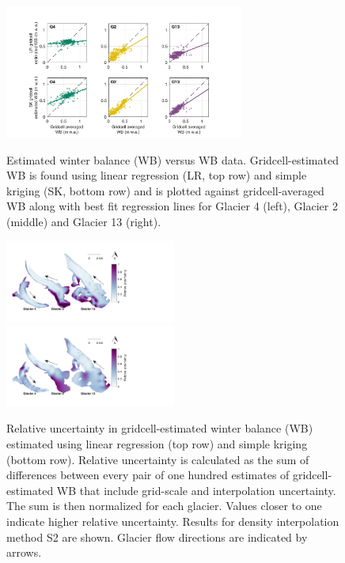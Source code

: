 \documentclass[twocolumn, letterpaper]{igs}
\begin{document}
\begin{figure}
	\centering
	\includegraphics[width =0.7\textwidth]{observedVSestimated_S2.pdf}\\
	\caption{Estimated winter balance (WB) versus WB data. Gridcell-estimated WB is found using linear regression (LR, top row) and simple kriging (SK, bottom row) and is plotted against gridcell-averaged WB along with best fit regression lines for Glacier 4 (left), Glacier 2 (middle) and Glacier 13 (right).}
	\label{fig:observedVSestimated_S2}
\end{figure}

\begin{figure}
	\centering
	\includegraphics[width =0.5\textwidth]{SpatialVar_LR.pdf}\\
	\includegraphics[width =0.5\textwidth]{SpatialVar_SK.pdf}\\
	\caption{Relative uncertainty in gridcell-estimated winter balance (WB) estimated using linear regression (top row) and simple kriging (bottom row). Relative uncertainty is calculated as the sum of differences between every pair of one hundred estimates of gridcell-estimated WB that include grid-scale and interpolation uncertainty. The sum is then normalized for each glacier. Values closer to one indicate higher relative uncertainty. Results for density interpolation method S2 are shown. Glacier flow directions are indicated by arrows.}
	\label{fig:WSMBspatialvar}
\end{figure}
\end{document}
